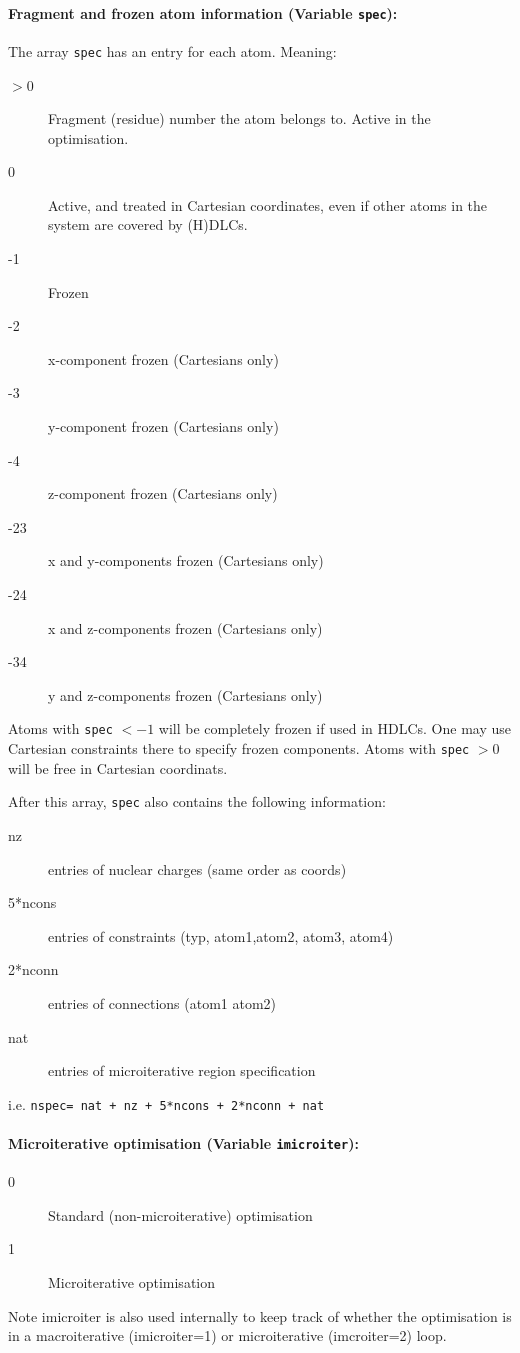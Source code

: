 \documentclass{article}
\begin{document}
\paragraph{Fragment and frozen atom information (Variable \texttt{spec}):}
The array \texttt{spec} has an entry for each atom. Meaning:
\begin{description}
\item[$>$0] Fragment (residue) number the atom belongs to. Active in the
  optimisation.
\item[0]   Active, and treated in Cartesian coordinates, even if other atoms
  in the system are covered by (H)DLCs.
\item[-1]  Frozen 
\item[-2]  x-component frozen (Cartesians only)
\item[-3]  y-component frozen (Cartesians only)
\item[-4]  z-component frozen (Cartesians only)
\item[-23]  x and y-components frozen (Cartesians only)
\item[-24]  x and z-components frozen (Cartesians only)
\item[-34]  y and z-components frozen (Cartesians only)
\end{description}
Atoms with \texttt{spec} $<-1$ will be completely frozen if used in HDLCs. One
may use Cartesian constraints there to specify frozen components. Atoms with
\texttt{spec} $>0$ will be free in Cartesian coordinats.

After this array, \texttt{spec} also contains the following information:
\begin{description}
\item[nz]      entries of nuclear charges (same order as coords)
\item[5*ncons] entries of constraints (typ, atom1,atom2, atom3, atom4)
\item[2*nconn] entries of connections (atom1 atom2)
\item[nat]     entries of microiterative region specification
\end{description}
i.e. \texttt{nspec= nat + nz + 5*ncons + 2*nconn + nat}

\paragraph{Microiterative optimisation (Variable \texttt{imicroiter}):}
\begin{description}
\item[0]   Standard (non-microiterative) optimisation
\item[1]   Microiterative optimisation
\end{description}
Note imicroiter is also used internally to keep track of whether the optimisation 
is in a macroiterative (imicroiter=1) or microiterative (imcroiter=2) loop.
\end{document}
